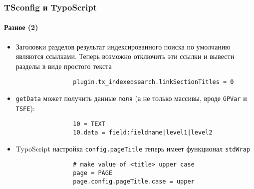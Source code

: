 \begin{frame}[fragile]
	\frametitle{TSconfig и TypoScript}
	\framesubtitle{Разное (2)}

	\begin{itemize}

		\item Заголовки разделов результат индексированного поиска по умолчанию являются ссылками.
			Теперь возможно отключить эти ссылки и вывести разделы в виде простого текста

			\begin{lstlisting}
				plugin.tx_indexedsearch.linkSectionTitles = 0
			\end{lstlisting}

		\item \texttt{getData} может получить данные \texttt{поля} (а не только массивы,
			вроде \texttt{GPVar} и \texttt{TSFE}):
		
			\begin{lstlisting}
				10 = TEXT
				10.data = field:fieldname|level1|level2
			\end{lstlisting}

		\item TypoScript настройка \texttt{config.pageTitle} теперь имеет функционал \texttt{stdWrap}

			\begin{lstlisting}
				# make value of <title> upper case
				page = PAGE
				page.config.pageTitle.case = upper
			\end{lstlisting}

	\end{itemize}

\end{frame}

